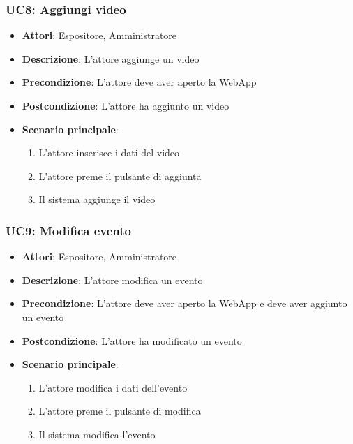 \subsubsection{UC8: Aggiungi video}
\label{subsubsec:uc8}
\begin{itemize}
    \item \textbf{Attori}: Espositore, Amministratore
    \item \textbf{Descrizione}: L'attore aggiunge un video
    \item \textbf{Precondizione}: L'attore deve aver aperto la WebApp
    \item \textbf{Postcondizione}: L'attore ha aggiunto un video
    \item \textbf{Scenario principale}:
    \begin{enumerate}
        \item L'attore inserisce i dati del video
        \item L'attore preme il pulsante di aggiunta
        \item Il sistema aggiunge il video
    \end{enumerate}
\end{itemize}

\subsubsection{UC9: Modifica evento}
\label{subsubsec:uc9}
\begin{itemize}
    \item \textbf{Attori}: Espositore, Amministratore
    \item \textbf{Descrizione}: L'attore modifica un evento
    \item \textbf{Precondizione}: L'attore deve aver aperto la WebApp e deve aver aggiunto un evento
\item \textbf{Postcondizione}: L'attore ha modificato un evento
    \item \textbf{Scenario principale}:
    \begin{enumerate}
        \item L'attore modifica i dati dell'evento
        \item L'attore preme il pulsante di modifica
        \item Il sistema modifica l'evento
    \end{enumerate}
\end{itemize}


